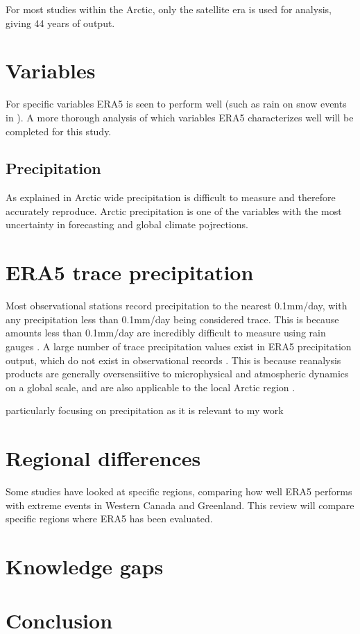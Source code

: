 \documentclass[11pt, oneside]{article}
\begin{document}
For most studies within the Arctic, only the satellite era is used for analysis, giving 44 years of output.


\section{Variables}
For specific variables ERA5 is seen to perform well (such as rain on snow events in \cite{dou2021trends}). A more thorough analysis of which variables ERA5 characterizes well will be completed for this study.


\subsection{Precipitation}\label{precipitation}
As explained in \cite{boisvert2018intercomparison} Arctic wide precipitation is difficult to measure and therefore accurately reproduce. Arctic precipitation is one of the variables with the most uncertainty in forecasting and global climate pojrections. 

\section{ERA5 trace precipitation}\label{traceprecip}
Most observational stations record precipitation to the nearest 0.1mm/day, with any precipitation less than 0.1mm/day being considered trace. This is because amounts less than 0.1mm/day are incredibly difficult to measure using rain gauges \cite[p.~3-50]{meteorological2015manobs}. A large number of trace precipitation values exist in ERA5 precipitation output, which do not exist in observational records \cite{shen2022performance}. This is because reanalysis products are generally oversensiitive to microphysical and atmospheric dynamics on a global scale, and are also applicable to the local Arctic region \cite{boisvert2018intercomparison}. 


particularly focusing on precipitation as it is relevant to my work
\section{Regional differences}
Some studies have looked at specific regions, comparing how well ERA5 performs with extreme events \cite{loeb2022extreme} in Western Canada and Greenland. This review will compare specific regions where ERA5 has been evaluated.


\section{Knowledge gaps}


\section{Conclusion}






 {}

\end{document}
